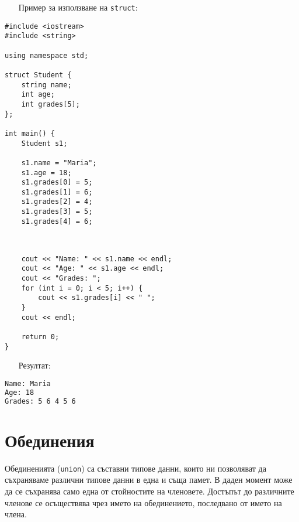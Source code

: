 \documentclass[oneside]{book}
\newcommand*{\code}[1]{\texttt{#1}}
\begin{document}
\begin{itemize}\item[Пример] за използване на \code{struct}:\end{itemize}\vspace{-12pt}
\begin{mdframed}\begin{lstlisting} 
#include <iostream>
#include <string>

using namespace std;

struct Student {
    string name;
    int age;
    int grades[5];
};

int main() {
    Student s1;

    s1.name = "Maria";
    s1.age = 18;
    s1.grades[0] = 5;
    s1.grades[1] = 6;
    s1.grades[2] = 4;
    s1.grades[3] = 5;
    s1.grades[4] = 6;
    
\end{lstlisting}\end{mdframed}
\begin{mdframed}\begin{lstlisting}[firstnumber=last]

    cout << "Name: " << s1.name << endl;
    cout << "Age: " << s1.age << endl;
    cout << "Grades: ";
    for (int i = 0; i < 5; i++) {
        cout << s1.grades[i] << " ";
    }
    cout << endl;

    return 0;
}
\end{lstlisting}\end{mdframed}

\begin{itemize}\item[Резултат:]\end{itemize}\vspace{-10pt}
\begin{mdframed}\begin{lstlisting}[language=bash]
Name: Maria
Age: 18
Grades: 5 6 4 5 6 
\end{lstlisting}\end{mdframed}

\section{Обединения}
Обединенията (\code{union}) са съставни типове данни, които ни позволяват да съхраняваме различни типове данни в една и съща памет.
В даден момент може да се съхранява само една от стойностите на членовете.
Достъпът до различните членове се осъществява чрез името на обединението, последвано от името на члена.
\end{document}
